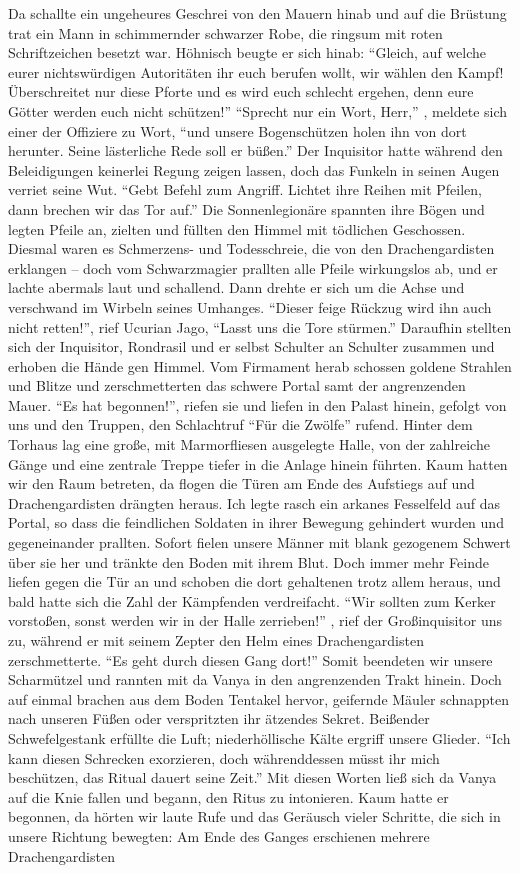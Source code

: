 Da schallte ein ungeheures Geschrei von den Mauern hinab und auf die Brüstung trat ein Mann in schimmernder schwarzer Robe, die ringsum mit roten Schriftzeichen besetzt war. Höhnisch beugte er sich hinab: ``Gleich, auf welche eurer nichtswürdigen Autoritäten ihr euch berufen wollt, wir wählen den Kampf! Überschreitet nur diese Pforte und es wird euch schlecht ergehen, denn eure Götter werden euch nicht schützen!'' ``Sprecht nur ein Wort, Herr,'' , meldete sich einer der Offiziere zu Wort, ``und unsere Bogenschützen holen ihn von dort herunter. Seine lästerliche Rede soll er büßen.'' Der Inquisitor hatte während den Beleidigungen keinerlei Regung zeigen lassen, doch das Funkeln in seinen Augen verriet seine Wut. ``Gebt Befehl zum Angriff. Lichtet ihre Reihen mit Pfeilen, dann brechen wir das Tor auf.'' Die Sonnenlegionäre spannten ihre Bögen und legten Pfeile an, zielten und füllten den Himmel mit tödlichen Geschossen. Diesmal waren es Schmerzens- und Todesschreie, die von den Drachengardisten erklangen -- doch vom Schwarzmagier prallten alle Pfeile wirkungslos ab, und er lachte abermals laut und schallend. Dann drehte er sich um die Achse und verschwand im Wirbeln seines Umhanges. ``Dieser feige Rückzug wird ihn auch nicht retten!'', rief Ucurian Jago, ``Lasst uns die Tore stürmen.'' Daraufhin stellten sich der Inquisitor, Rondrasil und er selbst Schulter an Schulter zusammen und erhoben die Hände gen Himmel. Vom Firmament herab schossen goldene Strahlen und Blitze und zerschmetterten das schwere Portal samt der angrenzenden Mauer. ``Es hat begonnen!'', riefen sie und liefen in den Palast hinein, gefolgt von uns und den Truppen, den Schlachtruf ``Für die Zwölfe'' rufend. Hinter dem Torhaus lag eine große, mit Marmorfliesen ausgelegte Halle, von der zahlreiche Gänge und eine zentrale Treppe tiefer in die Anlage hinein führten. Kaum hatten wir den Raum betreten, da flogen die Türen am Ende des Aufstiegs auf und Drachengardisten drängten heraus. Ich legte rasch ein arkanes Fesselfeld auf das Portal, so dass die feindlichen Soldaten in ihrer Bewegung gehindert wurden und gegeneinander prallten. Sofort fielen unsere Männer mit blank gezogenem Schwert über sie her und tränkte den Boden mit ihrem Blut. Doch immer mehr Feinde liefen gegen die Tür an und schoben die dort gehaltenen trotz allem heraus, und bald hatte sich die Zahl der Kämpfenden verdreifacht. ``Wir sollten zum Kerker vorstoßen, sonst werden wir in der Halle zerrieben!'' , rief der Großinquisitor uns zu, während er mit seinem Zepter den Helm eines Drachengardisten zerschmetterte. ``Es geht durch diesen Gang dort!'' Somit beendeten wir unsere Scharmützel und rannten mit da Vanya in den angrenzenden Trakt hinein. Doch auf einmal brachen aus dem Boden Tentakel hervor, geifernde Mäuler schnappten nach unseren Füßen oder verspritzten ihr ätzendes Sekret. Beißender Schwefelgestank erfüllte die Luft; niederhöllische Kälte ergriff unsere Glieder. ``Ich kann diesen Schrecken exorzieren, doch währenddessen müsst ihr mich beschützen, das Ritual dauert seine Zeit.'' Mit diesen Worten ließ sich da Vanya auf die Knie fallen und begann, den Ritus zu intonieren. Kaum hatte er begonnen, da hörten wir laute Rufe und das Geräusch vieler Schritte, die sich in unsere Richtung bewegten: Am Ende des Ganges erschienen mehrere Drachengardisten 